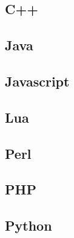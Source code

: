 \documentclass{KodeBook}
\begin{document}
\subsection{C++}

%

\subsection{Java}

%

\subsection{Javascript} 

%

%


\subsection{Lua}


\subsection{Perl}

%

\subsection{PHP}

%

\subsection{Python}

%
\end{document}
